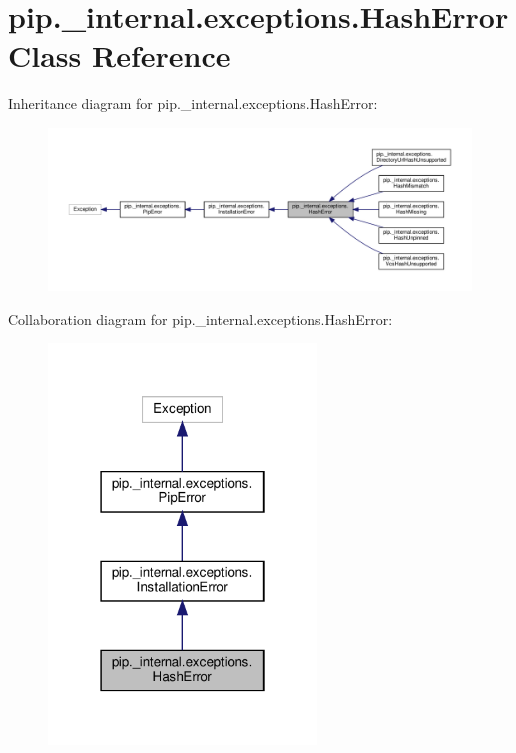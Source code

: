 \hypertarget{classpip_1_1__internal_1_1exceptions_1_1HashError}{}\section{pip.\+\_\+internal.\+exceptions.\+Hash\+Error Class Reference}
\label{classpip_1_1__internal_1_1exceptions_1_1HashError}


Inheritance diagram for pip.\+\_\+internal.\+exceptions.\+Hash\+Error\+:
\nopagebreak
\begin{figure}[H]
\begin{center}
\leavevmode
\includegraphics[width=350pt]{classpip_1_1__internal_1_1exceptions_1_1HashError__inherit__graph}
\end{center}
\end{figure}


Collaboration diagram for pip.\+\_\+internal.\+exceptions.\+Hash\+Error\+:
\nopagebreak
\begin{figure}[H]
\begin{center}
\leavevmode
\includegraphics[width=202pt]{classpip_1_1__internal_1_1exceptions_1_1HashError__coll__graph}
\end{center}
\end{figure}
